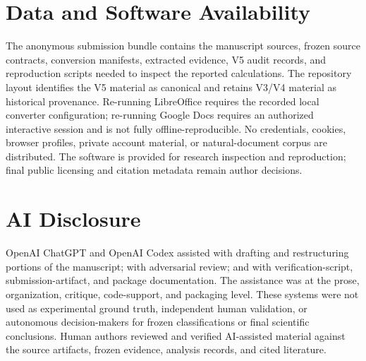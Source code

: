 \documentclass[conference]{IEEEtran}
\begin{document}
\section*{Data and Software Availability}
The anonymous submission bundle contains the manuscript sources, frozen source contracts, conversion manifests, extracted evidence, V5 audit records, and reproduction scripts needed to inspect the reported calculations. The repository layout identifies the V5 material as canonical and retains V3/V4 material as historical provenance. Re-running LibreOffice requires the recorded local converter configuration; re-running Google Docs requires an authorized interactive session and is not fully offline-reproducible. No credentials, cookies, browser profiles, private account material, or natural-document corpus are distributed. The software is provided for research inspection and reproduction; final public licensing and citation metadata remain author decisions.

\section*{AI Disclosure}
OpenAI ChatGPT and OpenAI Codex assisted with drafting and restructuring portions of the manuscript; with adversarial review; and with verification-script, submission-artifact, and package documentation. The assistance was at the prose, organization, critique, code-support, and packaging level. These systems were not used as experimental ground truth, independent human validation, or autonomous decision-makers for frozen classifications or final scientific conclusions. Human authors reviewed and verified AI-assisted material against the source artifacts, frozen evidence, analysis records, and cited literature.



\end{document}
